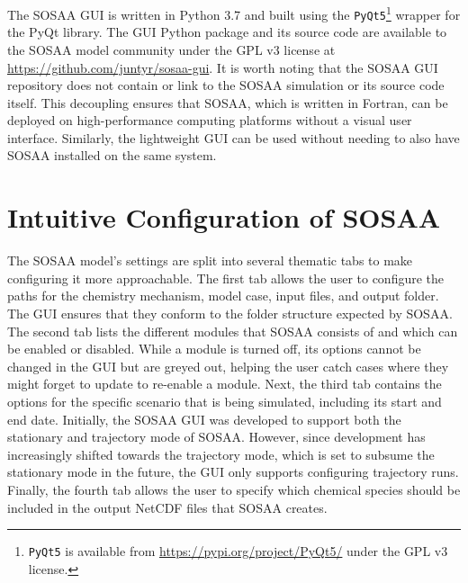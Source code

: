 The SOSAA GUI is written in Python 3.7 \cite{python-3.7} and built using the \texttt{PyQt5}\footnote{\texttt{PyQt5} is available from \href{https://pypi.org/project/PyQt5/}{https://pypi.org/project/PyQt5/} under the GPL v3 license.} wrapper for the PyQt library. The GUI Python package and its source code are available to the SOSAA model community under the GPL v3 license at \href{https://github.com/juntyr/sosaa-gui}{https://github.com/juntyr/sosaa-gui}. It is worth noting that the SOSAA GUI repository does not contain or link to the SOSAA simulation or its source code itself. This decoupling ensures that SOSAA, which is written in Fortran, can be deployed on high-performance computing platforms without a visual user interface. Similarly, the lightweight GUI can be used without needing to also have SOSAA installed on the same system.

\section{Intuitive Configuration of SOSAA} \label{txt:sosaa-gui-config}

The SOSAA model's settings are split into several thematic tabs to make configuring it more approachable. The first tab allows the user to configure the paths for the chemistry mechanism, model case, input files, and output folder. The GUI ensures that they conform to the folder structure expected by SOSAA. The second tab lists the different modules that SOSAA consists of and which can be enabled or disabled. While a module is turned off, its options cannot be changed in the GUI but are greyed out, helping the user catch cases where they might forget to update to re-enable a module. Next, the third tab contains the options for the specific scenario that is being simulated, including its start and end date. Initially, the SOSAA GUI was developed to support both the stationary and trajectory mode of SOSAA. However, since development has increasingly shifted towards the trajectory mode, which is set to subsume the stationary mode in the future, the GUI only supports configuring trajectory runs. Finally, the fourth tab allows the user to specify which chemical species should be included in the output NetCDF files that SOSAA creates.

